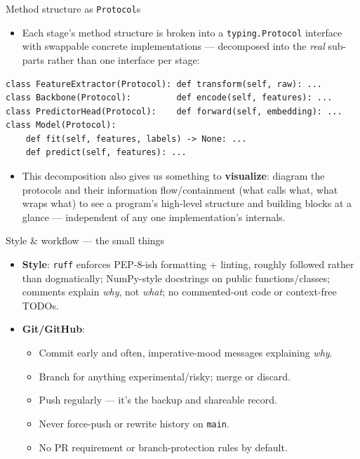 \documentclass[11pt]{beamer}
\begin{document}
\begin{frame}[fragile]{Method structure as \texttt{Protocol}s}
  \small
  \begin{itemize}
    \item Each stage's method structure is broken into a
      \texttt{typing.Protocol} interface with swappable concrete
      implementations --- decomposed into the \emph{real} sub-parts rather
      than one interface per stage:
  \end{itemize}
\begin{lstlisting}[basicstyle=\ttfamily\scriptsize]
class FeatureExtractor(Protocol): def transform(self, raw): ...
class Backbone(Protocol):         def encode(self, features): ...
class PredictorHead(Protocol):    def forward(self, embedding): ...
class Model(Protocol):
    def fit(self, features, labels) -> None: ...
    def predict(self, features): ...
\end{lstlisting}
  \begin{itemize}
    \item This decomposition also gives us something to
      \textbf{visualize}: diagram the protocols and their
      information flow/containment (what calls what, what wraps what) to
      see a program's high-level structure and building blocks at a
      glance --- independent of any one implementation's internals.
  \end{itemize}
\end{frame}

\begin{frame}{Style \& workflow --- the small things}
  \begin{itemize}
    \item \textbf{Style}: \texttt{ruff} enforces PEP-8-ish formatting +
      linting, roughly followed rather than dogmatically; NumPy-style
      docstrings on public functions/classes; comments explain \emph{why},
      not \emph{what}; no commented-out code or context-free TODOs.
    \item \textbf{Git/GitHub}:
      \begin{itemize}
        \small
        \item Commit early and often, imperative-mood messages explaining
          \emph{why}.
        \item Branch for anything experimental/risky; merge or discard.
        \item Push regularly --- it's the backup and shareable record.
        \item Never force-push or rewrite history on \texttt{main}.
        \item No PR requirement or branch-protection rules by default.
      \end{itemize}
  \end{itemize}
\end{frame}
\end{document}

